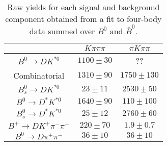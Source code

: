 \begin{table}
  \centering
  \begin{tabular}{ccc}
      \toprule
       & $K\pi\pi\pi$ & $\pi K\pi\pi$ \\
      \midrule
      $B^0 \to DK^{*0}$ & $1100 \pm 30$ & ?? \\
      Combinatorial & $1310 \pm 90$ & $1750 \pm 130$ \\
      $B^0_s \to DK^{*0}$ & $23 \pm 11$ & $2530 \pm 50$ \\
      $B^0 \to D^*K^{*0}$ & $1640 \pm 90$ & $110 \pm 100$ \\
      $B^0_s \to D^*K^{*0}$ & $25 \pm 12$ & $2760 \pm 60$ \\
      $B^+ \to DK^+\pi^-\pi^+$ & $220 \pm 70$ & $1.9 \pm 0.7$ \\
      $B^0 \to D\pi^+\pi^-$ & $36 \pm 10$ & $36 \pm 10$ \\
      \bottomrule
      \end{tabular}
  \caption{Raw yields for each signal and background component obtained from a fit to four-body data summed over $B^0$ and $\bar{B}^0$.}
\label{tab:yields_combined_4body}
\end{table}
